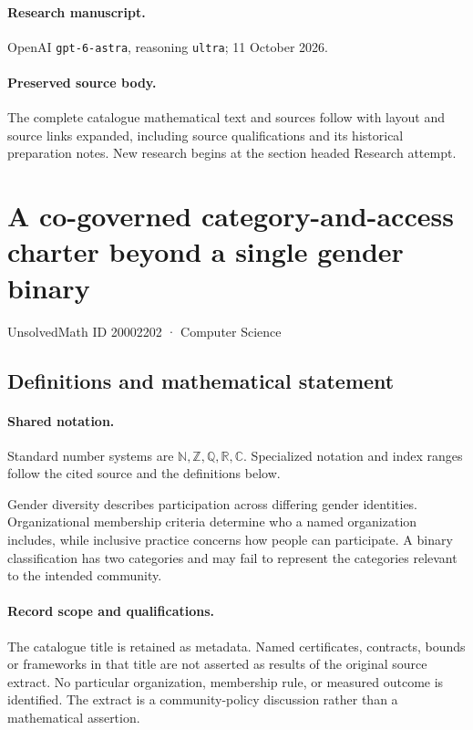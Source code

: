 \documentclass[11pt]{article}
\begin{document}
\paragraph{Research manuscript.} OpenAI \texttt{gpt-6-astra}, reasoning \texttt{ultra}; 11 October 2026.
\paragraph{Preserved source body.} The complete catalogue mathematical text and sources follow with layout and source links expanded, including source qualifications and its historical preparation notes. New research begins at the section headed Research attempt.

\section{A co-governed category-and-access charter beyond a single gender binary}\label{20002202}
{\small UnsolvedMath ID 20002202 · Computer Science}
\subsection{Definitions and mathematical statement}

\paragraph{Shared notation.}Standard number systems are $\mathbb N,\mathbb Z,\mathbb Q,\mathbb R,\mathbb C$. Specialized notation and index ranges follow the cited source and the definitions below.


Gender diversity describes participation across differing gender identities. Organizational membership criteria determine who a named organization includes, while inclusive practice concerns how people can participate. A binary classification has two categories and may fail to represent the categories relevant to the intended community.
\paragraph{Record scope and qualifications.}
The catalogue title is retained as metadata. Named certificates, contracts, bounds or frameworks in that title are not asserted as results of the original source extract.
No particular organization, membership rule, or measured outcome is identified. The extract is a community-policy discussion rather than a mathematical assertion.
\end{document}
